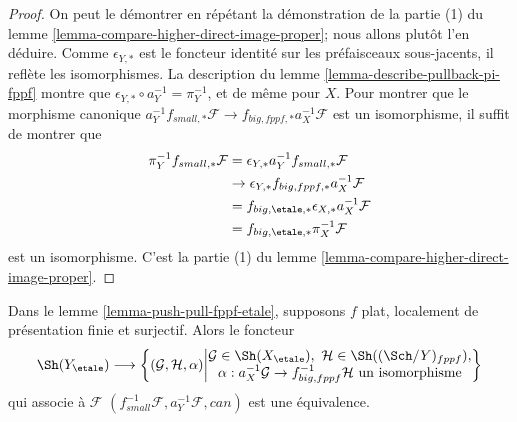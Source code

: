\begin{proof}
On peut le démontrer en répétant la démonstration de la
partie (1) du lemme \ref{lemma-compare-higher-direct-image-proper};
nous allons plutôt l'en déduire.
Comme $\epsilon_{Y, *}$ est le foncteur identité sur les préfaisceaux sous-jacents,
il reflète les isomorphismes. La description
du lemme \ref{lemma-describe-pullback-pi-fppf}
montre que $\epsilon_{Y, *} \circ a_Y^{-1} = \pi_Y^{-1}$,
et de même pour $X$. Pour montrer que le morphisme canonique
$a_Y^{-1}f_{small, *}\mathcal{F} \to f_{big, fppf, *}a_X^{-1}\mathcal{F}$
est un isomorphisme, il suffit de montrer que
\begin{align*}
\pi_Y^{-1}f_{small, *}\mathcal{F}
& =
\epsilon_{Y, *}a_Y^{-1}f_{small, *}\mathcal{F} \\
& \to 
\epsilon_{Y, *}f_{big, fppf, *}a_X^{-1}\mathcal{F} \\
& =
f_{big, \etale, *} \epsilon_{X, *}a_X^{-1}\mathcal{F} \\
& =
f_{big, \etale, *}\pi_X^{-1}\mathcal{F}
\end{align*}
est un isomorphisme. C'est la partie
(1) du lemme \ref{lemma-compare-higher-direct-image-proper}.
\end{proof}

\begin{lemma}
\label{lemma-descent-sheaf-fppf-etale}
Dans le lemme \ref{lemma-push-pull-fppf-etale}, supposons
$f$ plat, localement de présentation finie et surjectif.
Alors le foncteur
$$
\Sh(Y_\etale) \longrightarrow
\left\{
(\mathcal{G}, \mathcal{H}, \alpha)
\middle|
\begin{matrix}
\mathcal{G} \in \Sh(X_\etale),\ \mathcal{H} \in \Sh((\Sch/Y)_{fppf}), \\
\alpha : a_X^{-1}\mathcal{G} \to f_{big, fppf}^{-1}\mathcal{H}
\text{ un isomorphisme}
\end{matrix}
\right\}
$$
qui associe à $\mathcal{F}$
$(f_{small}^{-1}\mathcal{F}, a_Y^{-1}\mathcal{F}, can)$ est une équivalence.
\end{lemma}

